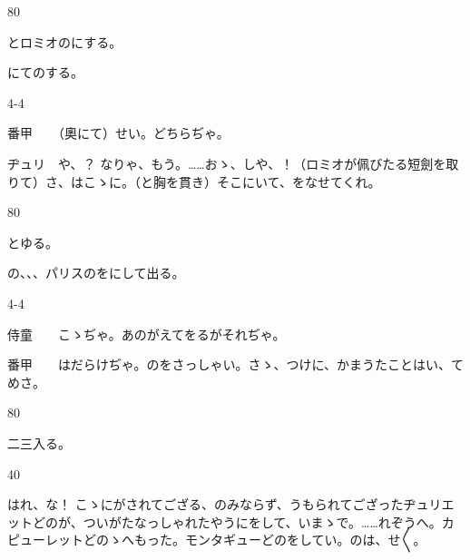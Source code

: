 \documentclass[tate,paper=b6j,jafontsize=9pt]{jlreq}
\begin{document}
\begin{azconvIndented}{8\zw}{0\zw}

とロミオのにする。

にてのする。

\end{azconvIndented}
\begin{azconvIndented}{4\zw}{-4\zw}

番甲　　（奧にて）せい。どちらぢゃ。

ヂュリ　や、？ なりゃ、もう。……おゝ、しや、！（ロミオが佩びたる短劍を取りて）さ、はこゝに。（と胸を貫き）そこにいて、をなせてくれ。

\end{azconvIndented}
\begin{azconvIndented}{8\zw}{0\zw}

とゆる。

の、、、パリスのをにして出る。

\end{azconvIndented}
\begin{azconvIndented}{4\zw}{-4\zw}

侍童　　こゝぢゃ。あのがえてをるがそれぢゃ。

番甲　　はだらけぢゃ。のをさっしゃい。さゝ、つけに、かまうたことはい、てめさ。

\end{azconvIndented}
\begin{azconvIndented}{8\zw}{0\zw}

二三入る。

\end{azconvIndented}
\begin{azconvIndented}{4\zw}{0\zw}

はれ、な！ こゝにがされてござる、のみならず、うもられてござったヂュリエットどのが、ついがたなっしゃれたやうにをして、いまゝで。……れぞうへ。カピューレットどのゝへもった。モンタギューどのをしてい。のは、せ{〳〵}。

\end{azconvIndented}
\end{document}

